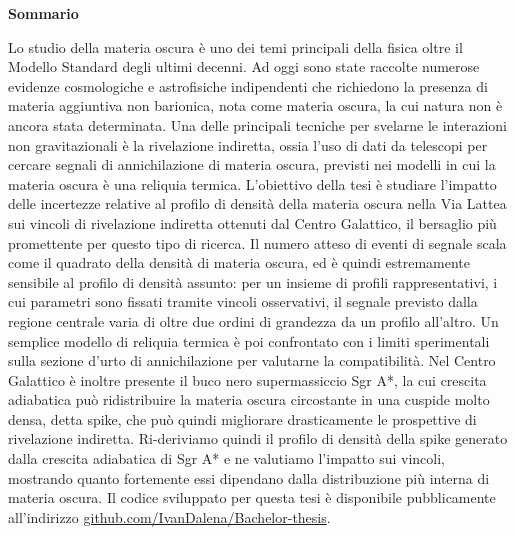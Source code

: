 \thispagestyle{empty}
\null\vfil

\begin{center}
  \bfseries Sommario
\end{center}

\vspace{1cm}


\noindent



Lo studio della materia oscura è uno dei temi principali della fisica oltre il Modello Standard degli ultimi decenni.
Ad oggi sono state raccolte numerose evidenze cosmologiche e astrofisiche indipendenti che richiedono la presenza di materia aggiuntiva non barionica, nota come materia oscura,
la cui natura non è ancora stata determinata.
Una delle principali tecniche per svelarne le interazioni non gravitazionali è la rivelazione indiretta,
ossia l'uso di dati da telescopi per cercare segnali di annichilazione di materia oscura, previsti nei modelli in cui la materia oscura è una reliquia termica.
L'obiettivo della tesi è studiare l'impatto delle incertezze relative al profilo di densità della materia oscura nella Via Lattea sui vincoli di rivelazione indiretta ottenuti dal Centro Galattico, il bersaglio più promettente per questo tipo di ricerca.
Il numero atteso di eventi di segnale scala come il quadrato della densità di materia oscura, ed è quindi estremamente sensibile al profilo di densità assunto: per un insieme di profili rappresentativi, i cui parametri sono fissati tramite vincoli osservativi, il segnale previsto dalla regione centrale varia di oltre due ordini di grandezza da un profilo all'altro.
Un semplice modello di reliquia termica è poi confrontato con i limiti sperimentali sulla sezione d'urto di annichilazione per valutarne la compatibilità.
Nel Centro Galattico è inoltre presente il buco nero supermassiccio Sgr A*,
la cui crescita adiabatica può ridistribuire la materia oscura circostante in una cuspide molto densa, detta spike, che può quindi migliorare drasticamente le prospettive di rivelazione indiretta.
Ri-deriviamo quindi il profilo di densità della spike generato dalla crescita adiabatica di Sgr A* e ne valutiamo l'impatto sui vincoli, 
mostrando quanto fortemente essi dipendano dalla distribuzione più interna di materia oscura.
Il codice sviluppato per questa tesi è disponibile pubblicamente all'indirizzo \href{https://github.com/IvanDalena/Bachelor-thesis}{\textcolor{githublink}{github.com/IvanDalena/Bachelor-thesis}}.



